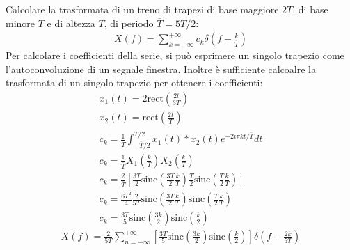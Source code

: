 \documentclass{article}
\begin{document}
Calcolare la trasformata di un treno di trapezi di base maggiore $2T$, di base minore $T$ e di altezza $T$, di periodo $\overline T=5T/2$:
\begin{gather*}
    X(f)=\displaystyle\sum_{k=-\infty}^{+\infty}c_k\delta\left(f-\frac{k}{\overline T}\right)
\end{gather*}
Per calcolare i coefficienti della serie, si può esprimere un singolo trapezio come l'autoconvoluzione di un segnale finestra. Inoltre è sufficiente calcoalre la 
trasformata di un singolo trapezio per ottenere i coefficienti:
\begin{gather*}
    x_1(t)=2\displaystyle\mbox{rect}\left(\frac{2t}{3T}\right)\\
    x_2(t)=\displaystyle\mbox{rect}\left(\frac{2t}{T}\right)\\
    c_k=\displaystyle\frac{1}{\overline T}\int_{-\overline T/2}^{\overline T/2}x_1(t)*x_2(t)e^{-2i\pi kt/\overline T}dt\\
    c_k=\displaystyle\frac{1}{\overline T}X_1\left(\frac{k}{ T}\right)X_2\left(\frac{k}{ T}\right)\\
    c_k=\displaystyle\frac{2}{\overline T}\left[\frac{3T}{2}\mbox{sinc}\left(\frac{3T}{2}\frac{k}{ T}\right)\frac{T}{2}\mbox{sinc}\left(\frac{T}{2}\frac{k}{ T}\right)\right]\\
    c_k=\displaystyle\frac{6T^2}{4}\frac{2}{5T}\mbox{sinc}\left(\frac{3T}{2}\frac{k}{ T}\right)\mbox{sinc}\left(\frac{T}{2}\frac{k}{ T}\right)\\
    c_k=\displaystyle\frac{3T}{5}\mbox{sinc}\left(\frac{3k}{2}\right)\mbox{sinc}\left(\frac{k}{2}\right)
\end{gather*}
\begin{gather}
    X(f)=\displaystyle\frac{2}{5T}\sum_{n=-\infty}^{+\infty}\left[\frac{3T}{5}\mbox{sinc}\left(\frac{3k}{2}\right)\mbox{sinc}\left(\frac{k}{2}\right)\right]\delta\left(f-\frac{2k}{5T}\right)
\end{gather}
\end{document}

